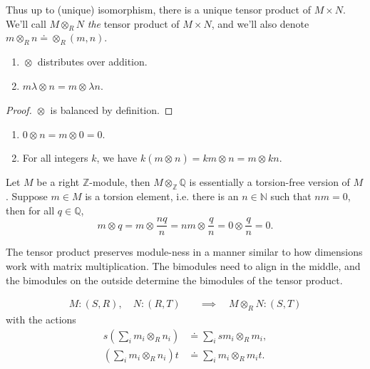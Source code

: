 \documentclass[twoside,10pt]{report}
\begin{document}
\begin{note}[]
	Thus up to (unique) isomorphism, there is a unique tensor product of $M \times N$. We'll call $M \otimes_{R}N$ \textit{the} tensor product of $M \times N$, and we'll also denote $m \otimes_{R}n \doteq \otimes_{R}(m,n)$.
\end{note}

\begin{prop}
\begin{enumerate}
	\item $\otimes_{}$ distributes over addition.
	\item $m \lambda\otimes_{}n = m \otimes_{}\lambda n$.
\end{enumerate}
\end{prop}
\begin{proof}
	$\otimes_{}$ is balanced by definition.
\end{proof}

\begin{cor}
\begin{enumerate}
	\item $0\otimes_{}n = m\otimes_{}0 = 0$.
	\item For all integers $k$, we have $k(m\otimes_{}n)=km \otimes_{}n = m\otimes_{}kn$.
\end{enumerate}
\end{cor}

\begin{ex}
	Let $M$ be a right $\mathbb{Z}$-module, then $M\otimes_{\mathbb{Z}}\mathbb{Q}$ is essentially a torsion-free version of $M$. Suppose $m \in M$ is a torsion element, i.e. there is an $n\in \mathbb{N}$ such that $n m = 0 $, then for all $q \in \mathbb{Q}$,
	\[
	m \otimes_{}q = m \otimes_{}\frac{n q}{n} = n m \otimes_{}\frac{q}{n} =0 \otimes_{}\frac{q}{n} =0.
	\] 
\end{ex}

The tensor product preserves module-ness in a manner similar to how dimensions work with matrix multiplication. The bimodules need to align in the middle, and the bimodules on the outside determine the bimodules of the tensor product.

\begin{prop}
	\begin{align*}
		M:(S,R), \quad N:(R,T) &\quad\implies\quad M\otimes_{R}N:(S,T)
	\end{align*}
	with the actions
	\begin{align*}
		s \left( \sum_i m_i \otimes_{R}n_i \right) &\doteq \sum_i sm_i \otimes_{R}m_i, \\
		\left( \sum_i m_i \otimes_{R}n_i \right) t &\doteq \sum_i m_i \otimes_{R}m_i t.
	\end{align*}
\end{prop}
\end{document}
